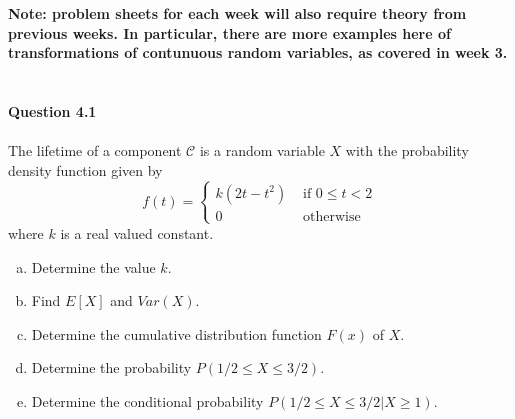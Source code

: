 \documentclass{article}
\begin{document}
%
%
{\bf Note: problem sheets for each week will also require theory from previous weeks. In particular, there are more examples here of transformations of contunuous random variables, as covered in week 3.}
~\\~\\
{\bf Question 4.1}
~\\~\\
The lifetime of a component $\mathcal{C}$ is a random variable $X$ with the probability density function given by
$$
f(t)=\begin{cases}
k(2t-t^2)&\text{ if }0\leq t<2\\
0&\text{ otherwise}
\end{cases}
$$
where $k$ is a real valued constant.
\begin{enumerate}[(a)]
\item Determine the value $k$.
\item Find $E[X]$ and $Var(X)$.
\item Determine the cumulative distribution function $F(x)$ of $X$.
\item Determine the probability $ P(1/2\leq X\leq3/2)$.
\item Determine the conditional probability $\displaystyle  P\left(1/2\leq X\leq3/2|X\geq 1\right)$.
\end{enumerate}
\end{document}
